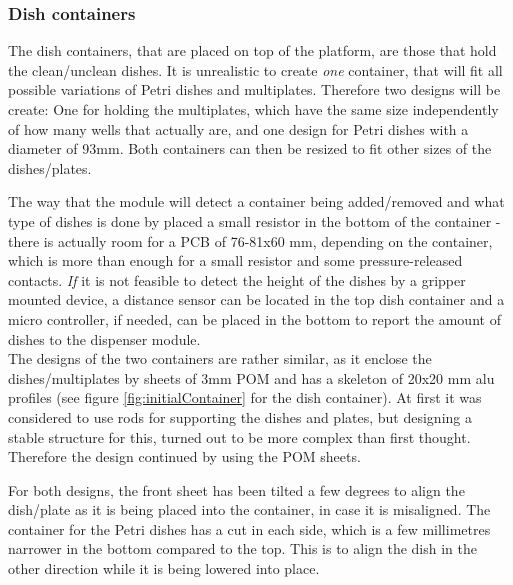 \documentclass[10pt,a4paper]{article}
\begin{document}
		
	\subsubsection{Dish containers}\label{subsubsec:Initial_DishContainers}
	
	The dish containers, that are placed on top of the platform, are those that hold the clean/unclean dishes. It is unrealistic to create \textit{one} container, that will fit all possible variations of Petri dishes and multiplates. Therefore two designs will be create: One for holding the multiplates, which have the same size independently of how many wells that actually are, and one design for Petri dishes with a diameter of 93mm. Both containers can then be resized to fit other sizes of the dishes/plates.
	
	
	
	The way that the module will detect a container being added/removed and what type of dishes is done by placed a small resistor in the bottom of the container - there is actually room for a PCB of 76-81x60 mm, depending on the container, which is more than enough for a small resistor and some pressure-released contacts. \textit{If} it is not feasible to detect the height of the dishes by a gripper mounted device, a distance sensor can be located in the top dish container and a micro controller, if needed, can be placed in the bottom to report the amount of dishes to the dispenser module.
	\\
	
	
	The designs of the two containers are rather similar, as it enclose the dishes/multiplates by sheets of 3mm POM and has a skeleton of 20x20 mm alu profiles (see figure \ref{fig:initialContainer} for the dish container). At first it was considered to use rods for supporting the dishes and plates, but designing a stable structure for this, turned out to be more complex than first thought. Therefore the design continued by using the POM sheets.
	
	
	For both designs, the front sheet has been tilted a few degrees to align the dish/plate as it is being placed into the container, in case it is misaligned. The container for the Petri dishes has a cut in each side, which is a few millimetres narrower in the bottom compared to the top. This is to align the dish in the other direction while it is being lowered into place.
	
\end{document}
